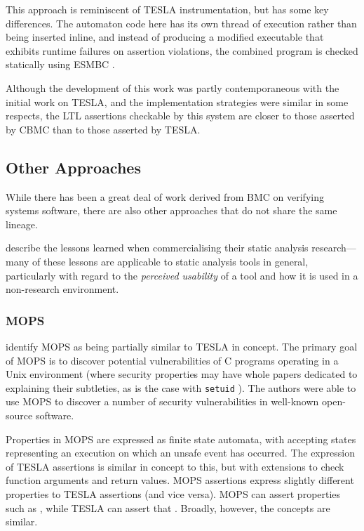 This approach is reminiscent of TESLA instrumentation, but has some key
differences. The automaton code here has its own thread of execution rather than
being inserted inline, and instead of producing a modified executable that
exhibits runtime failures on assertion violations, the combined program is
checked statically using ESMBC \cite{cordeiro_smt-based_2009}.

Although the development of this work was partly contemporaneous with
the initial work on TESLA, and the implementation strategies were
similar in some respects, the LTL assertions checkable by this system
are closer to those asserted by CBMC than to those asserted by TESLA.

\subsection{Other Approaches}

While there has been a great deal of work derived from BMC on verifying
systems software, there are also other approaches that do not share the
same lineage. 

\textcite{bessey_few_2010} describe the lessons learned when commercialising
their static analysis research---many of these lessons are applicable to static
analysis tools in general, particularly with regard to the \emph{perceived
usability} of a tool and how it is used in a non-research environment.

\subsubsection{MOPS}

\textcite{anderson_tesla:_2014} identify MOPS \cite{chen_mops:_2002} as being
partially similar to TESLA in concept. The primary goal of MOPS is to discover
potential vulnerabilities of C programs operating in a Unix environment (where
security properties may have whole papers dedicated to explaining their
subtleties, as is the case with \texttt{setuid} \cite{chen_setuid_2002}).
The authors were able to use MOPS to discover a number of security
vulnerabilities in well-known open-source software.

Properties in MOPS are expressed as finite state automata, with accepting states
representing an execution on which an unsafe event has occurred. The expression
of TESLA assertions is similar in concept to this, but with extensions to check
function arguments and return values. MOPS assertions express slightly
different properties to TESLA assertions (and vice versa). MOPS can assert
properties such as , while TESLA can assert that
. Broadly, however, the concepts are similar.

